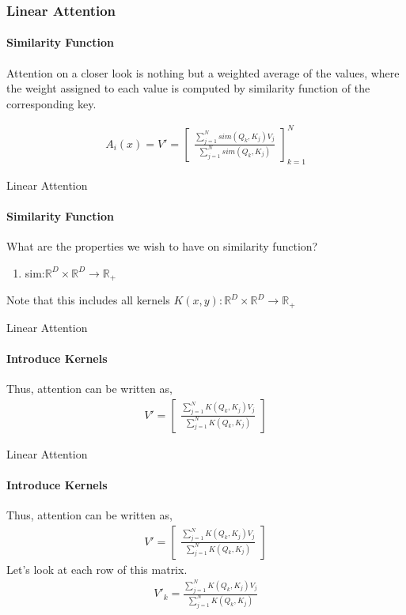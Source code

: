 \documentclass{beamer}
\newcommand{\R}{\mathbb{R}}
\begin{document}
    \begin{frame}
    \frametitle{Linear Attention}
    \framesubtitle{Similarity Function}
    Attention on a closer look is nothing but a weighted average of the values, where the weight assigned to each value is computed by similarity function of the corresponding key.
    
    \begin{align*}
        A_i(x)=V'=\begin{bmatrix}
             \frac{\sum_{j=1}^{N}sim(Q_k,K_j)V_j}{\sum_{j=1}^{N}sim(Q_k,K_j)}
        \end{bmatrix}_{k=1}^{N}
    \end{align*}

    
    \end{frame}

    \begin{frame}{Linear Attention}
    \framesubtitle{Similarity Function}
        What are the properties we wish to have on similarity function?
        \begin{enumerate}
            \item sim:$\R^D \times \R^D \rightarrow \R_{+}$ %
        \end{enumerate}
        \pause
        Note that this includes all kernels $K(x,y):\R^D \times \R^D \rightarrow \R_{+}$
    \end{frame}
    \begin{frame}{Linear Attention}
    \framesubtitle{Introduce Kernels}
    Thus, attention can be written as,
    \begin{align}
        V'=\begin{bmatrix}
        \frac{\sum_{j=1}^{N}K(Q_k,K_j)V_j}{\sum_{j=1}^{N}K(Q_k,K_j)}    
        \end{bmatrix}
    \end{align}
    \end{frame}
    \begin{frame}{Linear Attention}
    \framesubtitle{Introduce Kernels}
    Thus, attention can be written as,
    \begin{align*}
        V'=\begin{bmatrix}
        \frac{\sum_{j=1}^{N}K(Q_k,K_j)V_j}{\sum_{j=1}^{N}K(Q_k,K_j)}    
        \end{bmatrix}
    \end{align*}
    Let's look at each row of this matrix.
    \begin{align*}
        V'_k=\frac{\sum_{j=1}^{N}K(Q_k,K_j)V_j}{\sum_{j=1}^{N}K(Q_k,K_j)} 
    \end{align*}
    \end{frame}
\end{document}
